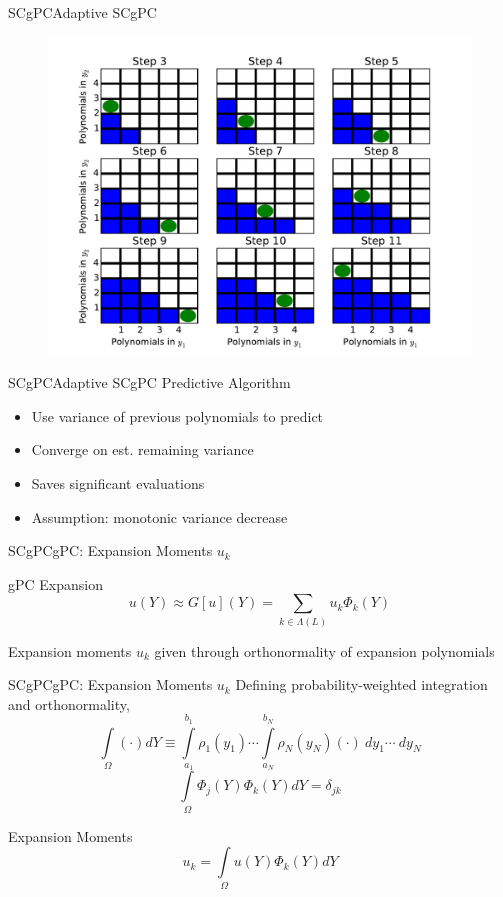 \documentclass{beamer}
\begin{document}
\begin{frame}{SCgPC}{Adaptive SCgPC}%
    \begin{figure}[h!]
      \centering
      \includegraphics[width=0.8\linewidth]{asc_block}
    \end{figure}
    \vfill
\end{frame}

\begin{frame}{SCgPC}{Adaptive SCgPC}%
  \vfill
  Predictive Algorithm
  \vfill
  \begin{itemize}
    \item Use variance of previous polynomials to predict
  \vfill
    \item Converge on est. remaining variance
  \vfill
    \item Saves significant evaluations
  \vfill
    \item Assumption: monotonic variance decrease
  \end{itemize}
  \vfill
\end{frame}


\begin{frame}{SCgPC}{gPC: Expansion Moments $u_k$}\vspace{-20pt}
  \vfill
  \begin{block}{gPC Expansion}
    \[u(Y) \approx G[u](Y) = \sum_{k\in\Lambda(L)} u_k \Phi_k(Y)\]
  \end{block}
  \vfill
  Expansion moments $u_k$ given through orthonormality of expansion polynomials
  \vfill
\end{frame}


\begin{frame}{SCgPC}{gPC: Expansion Moments $u_k$}%
Defining probability-weighted integration and orthonormality,
  \[\int\limits_\Omega (\cdot) dY 
      \equiv 
      \int\limits_{a_1}^{b_1}\rho_1(y_1) \cdots \int\limits_{a_N}^{b_N}\rho_N(y_N) (\cdot)\ dy_1\cdots\ dy_N\]
  \[\int\limits_\Omega \Phi_{j}(Y)\Phi_k(Y) dY = \delta_{j k}\]
  \begin{alertblock}{Expansion Moments}
    \[u_k = \int\limits_\Omega u(Y)\Phi_k(Y) dY\]
  \end{alertblock}
\end{frame}
\end{document}
